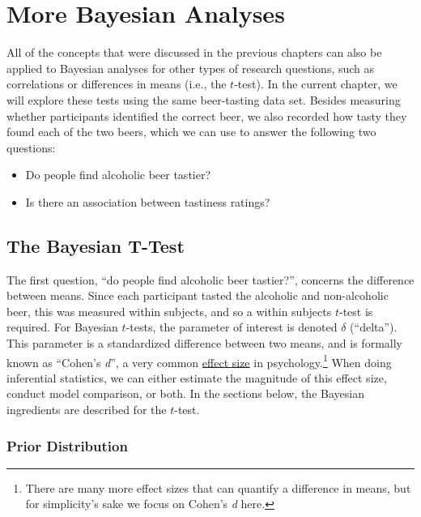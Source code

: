 \documentclass[
]{book}
\providecommand{\tightlist}{%
  \setlength{\itemsep}{0pt}\setlength{\parskip}{0pt}}
\begin{document}
\hypertarget{more-bayesian-analyses}{%
\chapter{More Bayesian Analyses}\label{more-bayesian-analyses}}

All of the concepts that were discussed in the previous chapters can also be applied to Bayesian analyses for other types of research questions, such as correlations or differences in means (i.e., the \(t\)-test). In the current chapter, we will explore these tests using the same beer-tasting data set. Besides measuring whether participants identified the correct beer, we also recorded how tasty they found each of the two beers, which we can use to answer the following two questions:

\begin{itemize}
\tightlist
\item
  Do people find alcoholic beer tastier?
\item
  Is there an association between tastiness ratings?
\end{itemize}

\hypertarget{the-bayesian-t-test}{%
\section{The Bayesian T-Test}\label{the-bayesian-t-test}}

The first question, ``do people find alcoholic beer tastier?'', concerns the difference between means. Since each participant tasted the alcoholic and non-alcoholic beer, this was measured within subjects, and so a within subjects \(t\)-test is required. For Bayesian \(t\)-tests, the parameter of interest is denoted \(\delta\) (``delta''). This parameter is a standardized difference between two means, and is formally known as ``Cohen's \emph{d}'', a very common \href{https://en.wikipedia.org/wiki/Effect_size}{effect size} in psychology.\footnote{There are many more effect sizes that can quantify a difference in means, but for simplicity's sake we focus on Cohen's \emph{d} here.} When doing inferential statistics, we can either estimate the magnitude of this effect size, conduct model comparison, or both. In the sections below, the Bayesian ingredients are described for the \(t\)-test.

\hypertarget{prior-distribution}{%
\subsection{Prior Distribution}\label{prior-distribution}}
\end{document}
